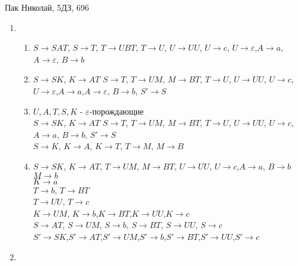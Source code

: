 \documentclass{article}
\begin{document}
\LARGE
	Пак Николай, 5ДЗ, 696\\
	\begin{enumerate}
		\item 
			\begin{enumerate}
				\item
					$S\rightarrow SAT$, $S\rightarrow T$, $T \rightarrow UBT$, $T \rightarrow U$, $U \rightarrow UU$, $U \rightarrow c$, $U \rightarrow \varepsilon$,$A \rightarrow a$, $A \rightarrow \varepsilon$, $B \rightarrow b$\\
				\item
					$S\rightarrow SK$, $K\rightarrow AT$ $S\rightarrow T$, $T \rightarrow UM$,
					$M \rightarrow BT$, $T \rightarrow U$, $U \rightarrow UU$, $U \rightarrow c$, $U \rightarrow \varepsilon$,$A \rightarrow a$,$A \rightarrow \varepsilon$,  $B \rightarrow b$, $S' \rightarrow S$\\		
				\item
				$U, A, T, S, K $ - $\varepsilon$-порождающие\\
					$S\rightarrow SK$, $K\rightarrow AT$ $S\rightarrow T$, $T \rightarrow UM$,
					$M \rightarrow BT$, $T \rightarrow U$, $U \rightarrow UU$, $U \rightarrow c$,$A \rightarrow a$, $B \rightarrow b$, $S' \rightarrow S$\\
					$S \rightarrow K$, $K \rightarrow A$, $K \rightarrow T$, $T \rightarrow M$, $M \rightarrow B$\\	 
					\item 
					$S\rightarrow SK$, $K\rightarrow AT$, $T \rightarrow UM$,
					$M \rightarrow BT$, $U \rightarrow UU$, $U \rightarrow c$,$A \rightarrow a$, $B \rightarrow b$\\
					$M \rightarrow b$\\
					$K \rightarrow a$\\
					$T \rightarrow b$, $T \rightarrow BT$\\
					$T \rightarrow UU$, $T \rightarrow c$\\
					$K \rightarrow UM$, $K \rightarrow b$,$K \rightarrow BT$,$K \rightarrow UU$,$K \rightarrow c$\\									
					$S \rightarrow AT$, $S \rightarrow UM$, $S \rightarrow b$, $S \rightarrow BT$, $S \rightarrow UU$, $S \rightarrow c$\\
					$S' \rightarrow SK$,$S' \rightarrow AT$,$S' \rightarrow UM$,$S' \rightarrow b$,$S' \rightarrow BT$,$S' \rightarrow UU$,$S' \rightarrow c$\\
			\end{enumerate}		
		\item
			\begin{enumerate}
				

\end{enumerate}
\end{enumerate}
\end{document}
